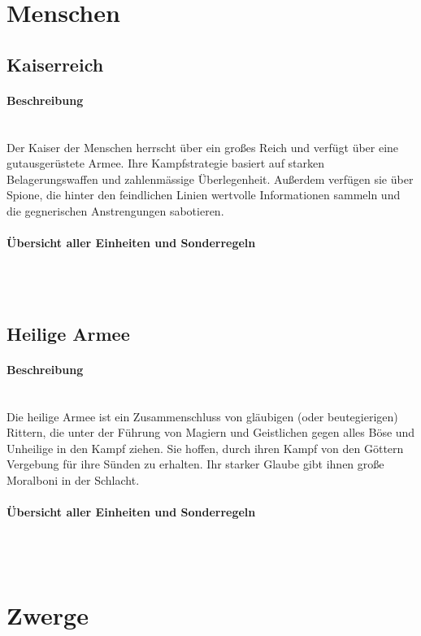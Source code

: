 \documentclass[a4paper,11pt]{report}
\begin{document}
\section{Menschen}
\subsection{Kaiserreich}
\paragraph{Beschreibung}~\\
Der Kaiser der Menschen herrscht über ein großes Reich und verfügt über eine gutausgerüstete Armee. Ihre Kampfstrategie basiert auf starken Belagerungswaffen und zahlenmässige Überlegenheit. Außerdem verfügen sie über Spione, die hinter den feindlichen Linien wertvolle Informationen sammeln und die gegnerischen Anstrengungen sabotieren.

\paragraph{Übersicht aller Einheiten und Sonderregeln}~\\
\\


\subsection{Heilige Armee}
\paragraph{Beschreibung}~\\
Die heilige Armee ist ein Zusammenschluss von gläubigen (oder beutegierigen) Rittern, die unter der Führung von Magiern und Geistlichen gegen alles Böse und Unheilige in den Kampf ziehen. Sie hoffen, durch ihren Kampf von den Göttern Vergebung für ihre Sünden zu erhalten.
Ihr starker Glaube gibt ihnen große Moralboni in der Schlacht.

\paragraph{Übersicht aller Einheiten und Sonderregeln}~\\
\\



\section{Zwerge}
\end{document}
